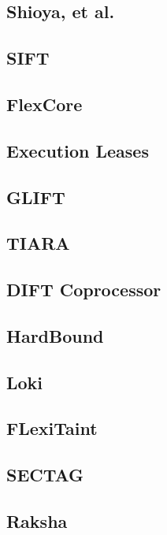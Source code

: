\subsection{Shioya, et al.}

\subsection{SIFT}

\subsection{FlexCore}

\subsection{Execution Leases}

\subsection{GLIFT}

\subsection{TIARA}

\subsection{DIFT Coprocessor}

\subsection{HardBound}

\subsection{Loki}

\subsection{FLexiTaint}

\subsection{SECTAG}

\subsection{Raksha}


